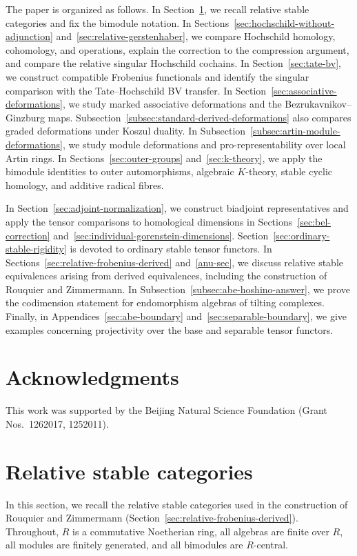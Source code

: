 \documentclass[12pt,a4paper,english,reqno]{amsart}
\numberwithin{equation}{section}
\theoremstyle{plain}
\theoremstyle{definition}
\begin{document}
The paper is organized as follows. In Section~\ref{sec:relative-and-abe},
we recall relative stable categories and fix the bimodule notation.
In Sections~\ref{sec:hochschild-without-adjunction}
and~\ref{sec:relative-gerstenhaber}, we compare Hochschild homology,
cohomology, and operations, explain the correction to the
compression argument, and compare the relative singular
Hochschild cochains. In Section~\ref{sec:tate-bv}, we construct
compatible Frobenius functionals and identify the singular
comparison with the Tate--Hochschild BV transfer. In Section~\ref{sec:associative-deformations}, we
study marked associative deformations and the
Bezrukavnikov--Ginzburg maps. Subsection~\ref{subsec:standard-derived-deformations}
also compares graded deformations under Koszul duality.
In Subsection~\ref{subsec:artin-module-deformations}, we study
module deformations and pro-representability over local Artin rings.
In Sections~\ref{sec:outer-groups} and~\ref{sec:k-theory}, we apply
the bimodule identities to outer automorphisms, algebraic
$K$-theory, stable cyclic homology, and additive radical fibres.

In Section~\ref{sec:adjoint-normalization}, we construct biadjoint
representatives and apply the tensor comparisons to homological
dimensions in Sections~\ref{sec:bel-correction}
and~\ref{sec:individual-gorenstein-dimensions}.
Section~\ref{sec:ordinary-stable-rigidity} is devoted to ordinary
stable tensor functors. In Sections~\ref{sec:relative-frobenius-derived}
and~\ref{anu-sec}, we discuss relative stable equivalences arising
from derived equivalences, including the construction of Rouquier
and Zimmermann. In Subsection~\ref{subsec:abe-hoshino-answer},
we prove the codimension statement for endomorphism algebras
of tilting complexes. Finally, in Appendices~\ref{sec:abe-boundary}
and~\ref{sec:separable-boundary}, we give examples concerning
projectivity over the base and separable tensor functors.


\section*{Acknowledgments}
This work was supported by the Beijing Natural Science Foundation (Grant Nos.~1262017, 1252011).


\section{Relative stable categories}
\label{sec:relative-and-abe}

In this section, we recall the relative stable categories used
in the construction of Rouquier and Zimmermann
(Section~\ref{sec:relative-frobenius-derived}). Throughout, $R$ is
a commutative Noetherian ring, all algebras are finite over $R$, all
modules are finitely generated, and all bimodules are $R$-central.
\end{document}
